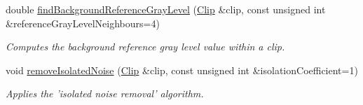 \begin{CompactItemize}
double \hyperlink{class_preprocessor_02439b5f88c76ddd6e3c92f3b22d56e0}{findBackgroundReferenceGrayLevel} (\hyperlink{class_clip}{Clip} \&clip, const unsigned int \&referenceGrayLevelNeighbours=4)
\begin{CompactList}\small\item\em Computes the background reference gray level value within a clip. \item\end{CompactList}\item 
void \hyperlink{class_preprocessor_a365f69af48cae608071e9943f300dd5}{removeIsolatedNoise} (\hyperlink{class_clip}{Clip} \&clip, const unsigned int \&isolationCoefficient=1)
\begin{CompactList}\small\item\em Applies the 'isolated noise removal' algorithm. \item\end{CompactList}\end{CompactItemize}
